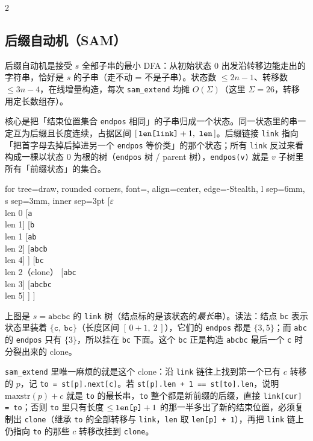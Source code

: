 \begin{multicols*}{2}
		\subsection{后缀自动机（SAM）}

		后缀自动机是接受 $s$ 全部子串的最小 DFA：从初始状态 $0$ 出发沿转移边能走出的字符串，恰好是 $s$ 的子串（走不动 = 不是子串）。状态数 $\le 2n - 1$、转移数 $\le 3n - 4$，在线增量构造，每次 \verb|sam_extend| 均摊 $O(\Sigma)$（这里 $\Sigma = 26$，转移用定长数组存）。

		核心是把「结束位置集合 \verb|endpos| 相同」的子串归成一个状态。同一状态里的串一定互为后缀且长度连续，占据区间 $[\,\verb|len[link]|+1,\ \verb|len|\,]$。后缀链接 \verb|link| 指向「把首字母去掉后掉进另一个 \verb|endpos| 等价类」的那个状态；所有 \verb|link| 反过来看构成一棵以状态 $0$ 为根的树（\verb|endpos| 树 / parent 树），\verb|endpos(v)| 就是 $v$ 子树里所有「前缀状态」的集合。

		\begin{center}
			\begin{forest}
				for tree={draw, rounded corners, font=\small, align=center,
				edge={-Stealth}, l sep=6mm, s sep=3mm, inner sep=3pt}
				[$\varepsilon$\\{\scriptsize len 0}
					[\texttt{a}\\{\scriptsize len 1}]
					[\texttt{b}\\{\scriptsize len 1}
						[\texttt{ab}\\{\scriptsize len 2}]
						[\texttt{abcb}\\{\scriptsize len 4}]
					]
					[\texttt{bc}\\{\scriptsize len 2（clone）}
						[\texttt{abc}\\{\scriptsize len 3}]
						[\texttt{abcbc}\\{\scriptsize len 5}]
					]
				]
			\end{forest}
		\end{center}

		上图是 $s = \texttt{abcbc}$ 的 \verb|link| 树（结点标的是该状态的\emph{最长}串）。读法：结点 \texttt{bc} 表示状态里装着 $\{\texttt{c},\ \texttt{bc}\}$（长度区间 $[\,0+1,\ 2\,]$），它们的 \verb|endpos| 都是 $\{3, 5\}$；而 \texttt{abc} 的 \verb|endpos| 只有 $\{3\}$，所以挂在 \texttt{bc} 下面。这个 \texttt{bc} 正是构造 \texttt{abcbc} 最后一个 \texttt{c} 时分裂出来的 clone。

		\verb|sam_extend| 里唯一麻烦的就是这个 clone：沿 \verb|link| 链往上找到第一个已有 $c$ 转移的 $p$，记 \verb|to = st[p].next[c]|。若 \verb|st[p].len + 1 == st[to].len|，说明 $\mathrm{maxstr}(p) + c$ 就是 \verb|to| 的最长串，\verb|to| 整个都是新前缀的后缀，直接 \verb|link[cur] = to|；否则 \verb|to| 里只有长度 $\le \verb|len[p]|+1$ 的那一半多出了新的结束位置，必须复制出 \verb|clone|（继承 \verb|to| 的全部转移与 \verb|link|，\verb|len| 取 \verb|len[p] + 1|），再把 \verb|link| 链上仍指向 \verb|to| 的那些 $c$ 转移改挂到 \verb|clone|。


\end{multicols*}
